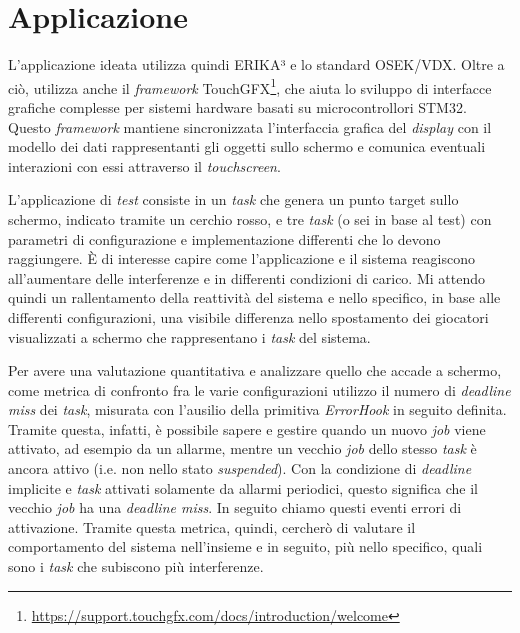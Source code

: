 \documentclass{article}
\begin{document}
\section{Applicazione}
L'applicazione ideata utilizza quindi ERIKA³ e lo standard OSEK/VDX. Oltre a ciò, utilizza anche il \textit{framework} TouchGFX\footnote{\url{https://support.touchgfx.com/docs/introduction/welcome}}, che aiuta lo sviluppo di interfacce grafiche complesse per sistemi hardware basati su microcontrollori STM32. Questo \textit{framework} mantiene sincronizzata l'interfaccia grafica del \textit{display} con il modello dei dati rappresentanti gli oggetti sullo schermo e comunica eventuali interazioni con essi attraverso il \textit{touchscreen}.

L'applicazione di \textit{test} consiste in un \textit{task} che genera un punto target sullo schermo, indicato tramite un cerchio rosso, e tre \textit{task} (o sei in base al test) con parametri di configurazione e implementazione differenti che lo devono raggiungere.
È di interesse capire come l'applicazione e il sistema reagiscono all'aumentare delle interferenze e in differenti condizioni di carico. Mi attendo quindi un rallentamento della reattività del sistema e nello specifico, in base alle differenti configurazioni, una visibile differenza nello spostamento dei giocatori visualizzati a schermo che rappresentano i \textit{task} del sistema.

Per avere una valutazione quantitativa e analizzare quello che accade a schermo, come metrica di confronto fra le varie configurazioni utilizzo il numero di \textit{deadline miss} dei \textit{task}, misurata con l'ausilio della primitiva \textit{ErrorHook} in seguito definita. Tramite questa, infatti, è possibile sapere e gestire quando un nuovo \textit{job} viene attivato, ad esempio da un allarme, mentre un vecchio \textit{job} dello stesso \textit{task} è ancora attivo (i.e. non nello stato \textit{suspended}). Con la condizione di \textit{deadline} implicite e \textit{task} attivati solamente da allarmi periodici, questo significa che il vecchio \textit{job} ha una \textit{deadline miss}. In seguito chiamo questi eventi errori di attivazione. 
Tramite questa metrica, quindi, cercherò di valutare il comportamento del sistema nell'insieme e in seguito, più nello specifico, quali sono i \textit{task} che subiscono più interferenze.
\end{document}
